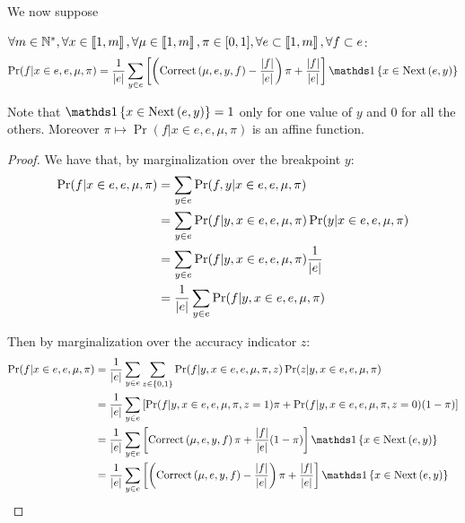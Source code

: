 We now suppose 
\begin{lemma}[$e_j$ transition]
    \label{lemma:bos_transition}
    $\forall m \in \mathbb{N}^*, \forall x \in \left\llbracket1, m\right\rrbracket, \forall \mu \in \left\llbracket1, m\right\rrbracket, \pi \in [0, 1], \forall e \subset \left\llbracket1, m\right\rrbracket, \forall f \subset e$:
    \[ \Pr(f | x \in e, e, \mu, \pi) =  \frac{1}{\card{e}}  \sum_{y \in e} \left[ \left( \correct{\mu}{e}{y}{f} - \frac{\card{f}}{\card{e}} \right) \pi + \frac{\card{f}}{\card{e}} \right]  \indickronecker{x \in \nextes{e}{y}} \]

    Note that $\indickronecker{x \in \nextes{e}{y}} = 1$ only for one value of $y$ and $0$ for all the others. Moreover $\pi \mapsto \Pr(f | x \in e, e, \mu, \pi)$ is an affine function.
\end{lemma}
\begin{proof}
    We have that, by marginalization over the breakpoint $y$:
    \begin{align}
        \Pr(f | x \in e, e, \mu, \pi) 
        &= \sum_{y \in e} \Pr(f, y | x \in e, e, \mu, \pi) \\
        &= \sum_{y \in e} \Pr(f | y, x \in e, e, \mu, \pi) \Pr(y | x \in e, e, \mu, \pi) \\
        &= \sum_{y \in e} \Pr(f | y, x \in e, e, \mu, \pi) \frac{1}{\left|e\right|} \\
        &= \frac{1}{\left|e\right|} \sum_{y \in e} \Pr(f | y, x \in e, e, \mu, \pi)
    \end{align}

    Then by marginalization over the accuracy indicator $z$:
    \begin{align}
        \Pr(f | x \in e, e, \mu, \pi) 
        &= \frac{1}{\card{e}} \sum_{y \in e} \sum_{z \in \set{0, 1}} \Pr(f | y, x \in e, e, \mu, \pi, z) \Pr(z | y, x \in e, e, \mu, \pi) \\
        &= \frac{1}{\card{e}} \sum_{y \in e} \left[ \Pr(f | y, x \in e, e, \mu, \pi, z=1) \pi + \Pr(f | y, x \in e, e, \mu, \pi, z=0) (1 - \pi) \right] \\
        &= \frac{1}{\card{e}}  \sum_{y \in e} \left[ \correct{\mu}{e}{y}{f} \pi + \frac{\card{f}}{\card{e}} (1 - \pi) \right]  \indickronecker{x \in \nextes{e}{y}} \\
        &= \frac{1}{\card{e}}  \sum_{y \in e} \left[ \left( \correct{\mu}{e}{y}{f} - \frac{\card{f}}{\card{e}} \right) \pi + \frac{\card{f}}{\card{e}} \right]  \indickronecker{x \in \nextes{e}{y}}
    \end{align}
\end{proof}

